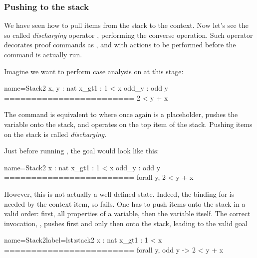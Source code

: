 \subsubsection{Pushing to the stack}

We have seen how to pull items from the stack to the context.
Now let's see the so called \emph{discharging} operator \C{:}, performing
the converse operation.
Such operator decorates
proof commands as ,  and 
 with actions to be performed before the command is actually run.


Imagine we want to perform case analysis on  at this stage:

\begin{coqout}{name=Stack2}{}
 x, y : nat
 x_gt1 : 1 < x
 odd_y : odd y
 ========================
 2 < y + x
\end{coqout}

The command  is equivalent to
 where  once again is a placeholder,
 pushes the  variable onto the stack, and 
operates on the top item of the stack.
Pushing items on the stack is called \emph{discharging}.

Just before running , the goal would look like this:

\begin{coqout}{name=Stack2}{}
 x : nat
 x_gt1 : 1 < x
 odd_y : odd y
 ========================
 forall y, 2 < y + x
\end{coqout}

However, this is not actually a well-defined state.
Indeed, the binding for  is needed by the 
context item, so  fails.  One has to push items onto the
stack in a valid order: first, all properties of a variable, then the
variable itself.  The correct invocation,
, pushes first  and only then  onto
the stack, leading to the valid goal

\begin{coqout}{name=Stack2}{label=lst:stack2}
 x : nat
 x_gt1 : 1 < x
 ========================
 forall y, odd y -> 2 < y + x
\end{coqout}


